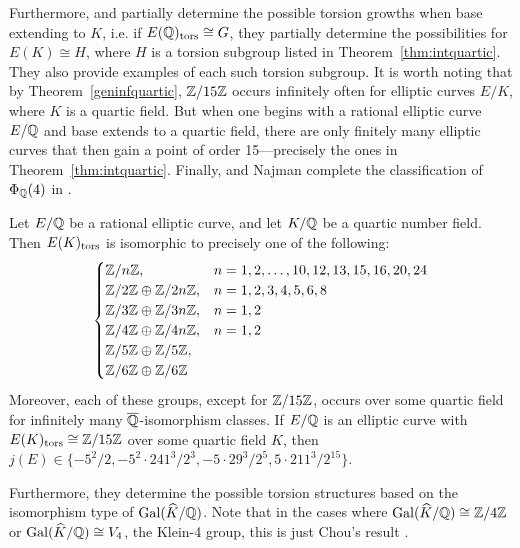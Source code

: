 Furthermore, \gonjim{} and \lozrob{} partially determine the possible torsion growths when base extending to $K$, i.e. if $E(\mathbb{Q})_{\text{tors}} \cong G$, they partially determine the possibilities for $E(K) \cong H$, where $H$ is a torsion subgroup listed in Theorem~\ref{thm:intquartic}. They also provide examples of each such torsion subgroup. It is worth noting that by Theorem~\ref{geninfquartic}, $\mathbb{Z}/15\mathbb{Z}$ occurs infinitely often for elliptic curves $E/K$, where $K$ is a quartic field. But when one begins with a rational elliptic curve $E/\mathbb{Q}$ and base extends to a quartic field, there are only finitely many elliptic curves that then gain a point of order 15---precisely the ones in Theorem~\ref{thm:intquartic}. Finally, \gonjim{} and Najman complete the classification of $\Phi_{\mathbb{Q}}(4)$ in \cite{gonzalezjimeneznajman20base}.


\begin{thm}
Let $E/\mathbb{Q}$ be a rational elliptic curve, and let $K/\mathbb{Q}$ be a quartic number field. Then $E(K)_{\text{tors}}$ is isomorphic to precisely one of the following:
	\[
	\begin{cases}
	\mathbb{Z}/n\mathbb{Z}, & n= 1, 2, \ldots, 10, 12, 13, 15, 16, 20, 24 \\
	\mathbb{Z}/2\mathbb{Z} \oplus \mathbb{Z}/2n\mathbb{Z}, & n= 1, 2, 3, 4, 5, 6, 8 \\
	\mathbb{Z}/3\mathbb{Z} \oplus \mathbb{Z}/3n\mathbb{Z}, & n= 1, 2 \\
	\mathbb{Z}/4\mathbb{Z} \oplus \mathbb{Z}/4n\mathbb{Z}, & n= 1, 2 \\
	\mathbb{Z}/5\mathbb{Z} \oplus \mathbb{Z}/5\mathbb{Z}, \\
	\mathbb{Z}/6\mathbb{Z} \oplus \mathbb{Z}/6\mathbb{Z}
	\end{cases}
	\]
Moreover, each of these groups, except for $\mathbb{Z}/15\mathbb{Z}$, occurs over some quartic field for infinitely many $\overline{\mathbb{Q}}$-isomorphism classes. If $E/\mathbb{Q}$ is an elliptic curve with $E(K)_{\text{tors}} \cong \mathbb{Z}/15\mathbb{Z}$ over some quartic field $K$, then $j(E) \in \{ -5^2/2, -5^2 \cdot 241^3/2^3, -5 \cdot 29^3/2^5, 5 \cdot 211^3/2^{15} \}$. 
\end{thm}


Furthermore, they determine the possible torsion structures based on the isomorphism type of $\operatorname{Gal}(\widehat{K}/\mathbb{Q})$. Note that in the cases where $\operatorname{Gal}(\widehat{K}/\mathbb{Q}) \cong \mathbb{Z}/4\mathbb{Z}$ or $\operatorname{Gal}(\widehat{K}/\mathbb{Q}) \cong V_4$, the Klein-4 group, this is just Chou's result \cite{chou16}. 


